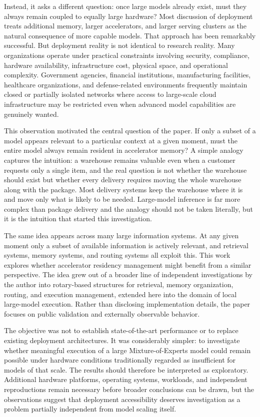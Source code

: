 \documentclass[11pt]{article}
\begin{document}
Instead, it asks a different question: once large models already exist, must they always remain coupled to equally large hardware? Most discussion of deployment treats additional memory, larger accelerators, and larger serving clusters as the natural consequence of more capable models. That approach has been remarkably successful. But deployment reality is not identical to research reality. Many organizations operate under practical constraints involving security, compliance, hardware availability, infrastructure cost, physical space, and operational complexity. Government agencies, financial institutions, manufacturing facilities, healthcare organizations, and defense-related environments frequently maintain closed or partially isolated networks where access to large-scale cloud infrastructure may be restricted even when advanced model capabilities are genuinely wanted.

This observation motivated the central question of the paper. If only a subset of a model appears relevant to a particular context at a given moment, must the entire model always remain resident in accelerator memory? A simple analogy captures the intuition: a warehouse remains valuable even when a customer requests only a single item, and the real question is not whether the warehouse should exist but whether every delivery requires moving the whole warehouse along with the package. Most delivery systems keep the warehouse where it is and move only what is likely to be needed. Large-model inference is far more complex than package delivery and the analogy should not be taken literally, but it is the intuition that started this investigation.

The same idea appears across many large information systems. At any given moment only a subset of available information is actively relevant, and retrieval systems, memory systems, and routing systems all exploit this. This work explores whether accelerator residency management might benefit from a similar perspective. The idea grew out of a broader line of independent investigations by the author into rotary-based structures for retrieval, memory organization, routing, and execution management, extended here into the domain of local large-model execution. Rather than disclosing implementation details, the paper focuses on public validation and externally observable behavior.

The objective was not to establish state-of-the-art performance or to replace existing deployment architectures. It was considerably simpler: to investigate whether meaningful execution of a large Mixture-of-Experts model could remain possible under hardware conditions traditionally regarded as insufficient for models of that scale. The results should therefore be interpreted as exploratory. Additional hardware platforms, operating systems, workloads, and independent reproductions remain necessary before broader conclusions can be drawn, but the observations suggest that deployment accessibility deserves investigation as a problem partially independent from model scaling itself.
\end{document}
